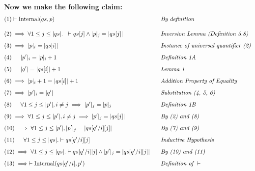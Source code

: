 \documentclass{article}
\begin{document}
\textbf{Now we make the following claim:}\\[-20pt]

\begin{alignat*}{5}
&(1) \vdash \text{Internal}(qs, p) && \hspace{0.3cm} \textit{By definition}\\[10pt]
&(2) \implies \forall 1 \leq j \leq |qs|. \hspace{0.2cm} \vdash qs[j] \land |p|_j = |qs[j]|&& \hspace{0.3cm} \textit{Inversion Lemma (Definition 3.8)}\\[5pt]
&(3) \implies |p|_i = |qs[i]|&& \hspace{0.3cm} \textit{Instance of universal quantifier (2)}\\[5pt]
&(4) \indent |p'|_i = |p|_i + 1&& \hspace{0.3cm} \textit{Definition 1A}\\[5pt]
&(5) \indent |q'| = |qs[i]| + 1&& \hspace{0.3cm} \textit{Lemma 1}\\[5pt]
&(6) \implies |p|_i + 1 = |qs[i]| + 1&& \hspace{0.3cm} \textit{Addition Property of Equality}\\[5pt]
&(7) \implies |p'|_i = |q'|&& \hspace{0.3cm} \textit{Substitution (4, 5, 6)}\\[5pt]
&(8) \indent \forall 1 \leq j \leq |p'|, i \neq j \implies |p'|_j = |p|_j&& \hspace{0.3cm} \textit{Definition 1B}\\[5pt]
&(9) \implies \forall 1 \leq j \leq |p'|, i \neq j \implies |p'|_j = |qs[j]|&& \hspace{0.3cm} \textit{By (2) and (8)}\\[5pt]
&(10) \implies \forall 1 \leq j \leq |p'|, |p'|_j = |qs[q' / i][j]|&& \hspace{0.3cm} \textit{By (7) and (9)}\\[5pt]
&(11)  \indent \forall 1 \leq j \leq |qs|. \vdash qs[q'/i][j]&& \hspace{0.3cm} \textit{Inductive Hypothesis}\\[5pt]
&(12) \implies \forall 1 \leq j \leq |qs|. \vdash qs[q'/i][j] \land |p'|_j = |qs[q'/i][j]|&&\hspace{0.3cm} \textit{By (10) and (11)}\\[5pt]
&(13) \implies \vdash \text{Internal}(qs[q'/i], p') && \hspace{0.3cm} \textit{Definition of } \vdash\\[-10pt]
\end{alignat*}
\end{document}
